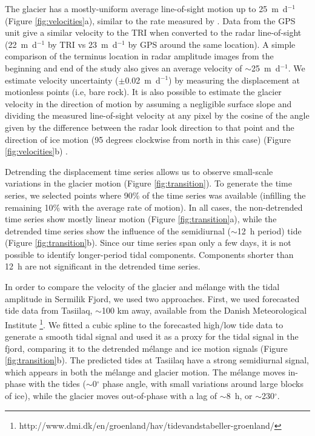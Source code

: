 The glacier has a mostly-uniform average line-of-sight motion up to 25~m~d$^{-1}$ (Figure \ref{fig:velocities}a), similar to the rate measured by \citet{de2010sudden}. Data from the GPS unit give a similar velocity to the TRI when converted to the radar line-of-sight (22~m~d$^{-1}$ by TRI vs 23~m~d$^{-1}$ by GPS around the same location). A simple comparison of the terminus location in radar amplitude images from the beginning and  end of the study also gives an average velocity of $\sim$25~m~d$^{-1}$. We estimate velocity uncertainty ($\pm$0.02~m~d$^{-1}$) by measuring the displacement at motionless points (i.e, bare rock). It is also possible to estimate the glacier velocity in the direction of motion by assuming a negligible surface slope and dividing the measured line-of-sight velocity at any pixel by the cosine of the angle given by the difference between the radar look direction to that point and the direction of ice motion (95 degrees clockwise from north in this case) (Figure \ref{fig:velocities}b) \citep{voytenko2014}.


Detrending the displacement time series allows us to observe small-scale variations in the glacier motion (Figure \ref{fig:transition}). To generate the time series, we selected points where 90\% of the time series was available (infilling the remaining 10\% with the average rate of motion). In all cases, the non-detrended time series show mostly linear motion (Figure \ref{fig:transition}a), while the detrended time series show the influence of the semidiurnal ($\sim$12~h period) tide (Figure \ref{fig:transition}b).  Since our time series span only a few days, it is not possible to identify longer-period tidal components.  Components shorter than 12~h are not significant in the detrended time series.



In order to compare the velocity of the glacier and m\'elange with the tidal amplitude in Sermilik Fjord, we used two approaches. First, we used forecasted tide data from Tasiilaq, $\sim$100 km away, available from the Danish Meteorological Institute \footnote{http://www.dmi.dk/en/groenland/hav/tidevandstabeller-groenland/}. We fitted a cubic spline to the forecasted high/low tide data to generate a smooth tidal signal and used it as a proxy for the tidal signal in the fjord, comparing it to the detrended m\'elange and ice motion signals (Figure \ref{fig:transition}b). The predicted tides at Tasiilaq have a strong semidiurnal signal, which appears in both the m\'elange and glacier motion. The m\'elange moves in-phase with the tides ($\sim$0$^{\circ}$ phase angle, with small variations around large blocks of ice), while the glacier moves out-of-phase with a lag of $\sim$8~h, or $\sim$230$^{\circ}$. 



